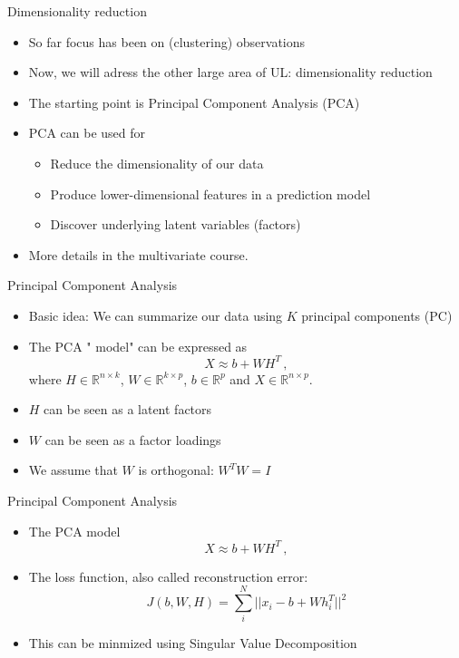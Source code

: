\documentclass[10pt]{beamer}
\begin{document}
\begin{frame}{Dimensionality reduction}

\begin{itemize}
\item So far focus has been on (clustering) {\color{uured} observations}
\item Now, we will adress the other large area of UL: {\color{uured} dimensionality reduction}\pause
\item The starting point is {\color{uured} Principal Component Analysis} (PCA)
\item PCA can be used for
\begin{itemize}
\item {\color{uured} Reduce the dimensionality} of our data
\item {\color{uured} Produce lower-dimensional features} in a prediction model
\item {\color{uured} Discover underlying latent variables} (factors)
\end{itemize}
\pause
\item More details in the multivariate course.
\end{itemize}

\end{frame}

\begin{frame}{Principal Component Analysis}

\begin{itemize}
\item {\color{uured} Basic idea}: We can summarize our data using $K$ principal components (PC)
\item The PCA "{\color{uured} model}" can be expressed as
\[
X \approx b +  W H^T\,,
\]
where $H \in \mathbb{R}^{n \times k}$, $W \in \mathbb{R}^{k \times p}$, $b \in \mathbb{R}^{p}$ and $X \in \mathbb{R}^{n \times p}$.
\item $H$ can be seen as a {\color{uured} latent factors}
\item $W$ can be seen as a {\color{uured} factor loadings}
\item We assume that $W$ is orthogonal: $W^T W = I$
\end{itemize}

\end{frame}

\begin{frame}{Principal Component Analysis}

\begin{itemize}
\item The PCA model
\[
X \approx b +  W H^T\,,
\]
\item The loss function, also called {\color{uured} reconstruction error}:
\[
J(b,W,H) = \sum_i^N ||x_i - b +  W h_i^T||^2
\]
\pause
\item This can be minmized using {\color{uured} Singular Value Decomposition}
\end{itemize}

\end{frame}
\end{document}
